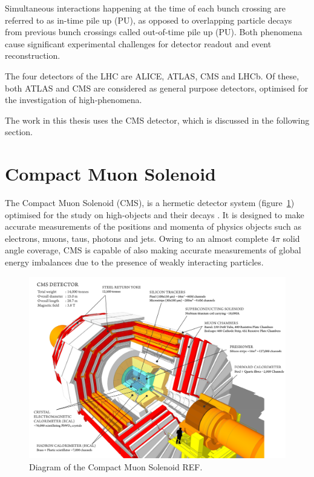 Simultaneous interactions happening at the time
of each bunch crossing are referred to as in-time pile up (PU), as opposed to 
overlapping particle decays from previous bunch crossings called out-of-time 
pile up (PU). Both phenomena cause significant 
experimental challenges for detector readout and event reconstruction.

The four detectors of the LHC are ALICE, ATLAS, CMS and LHCb. Of these,
both ATLAS and CMS 
are considered as general purpose detectors, optimised for the investigation of
high-\Pt phenomena.

The work in this thesis uses the CMS detector, which is discussed in 
the following section.


\section{Compact Muon Solenoid}  %
\label{sec:detector_overview}

The Compact Muon Solenoid (CMS), is a
hermetic detector system (figure~\ref{fig:cms_diagram})
optimised for the study on high-\Pt objects and their decays \cite
{CMSexperiment}.
It is designed to make accurate measurements of the positions and momenta of
physics objects such as electrons, muons, taus,
photons and jets. Owing to an almost complete 4$\pi$ solid angle coverage, CMS is 
capable of also making accurate measurements of global energy imbalances due to 
the presence of weakly interacting particles.

\begin{figure}[hb!]
  \centering
  \includegraphics[width=\textwidth]{Figs/machine/cms_120918_02.png}
  \caption{Diagram of the Compact Muon Solenoid REF.}
  \label{fig:cms_diagram}
\end{figure}

